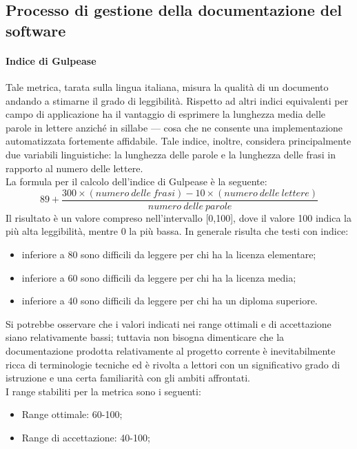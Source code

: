 			\subsection[Processo di gestione della documentazione del software]{\hypertarget{pgds}{Processo di gestione della documentazione del software}}
				
			\paragraph[Indice di Gulpease]{\hypertarget{ig}{Indice di Gulpease}}
			Tale metrica, tarata sulla lingua italiana, misura la qualità di un documento andando a stimarne il grado di leggibilità. Rispetto ad altri indici equivalenti per campo di applicazione ha il vantaggio di esprimere la lunghezza media delle parole in lettere anziché in sillabe --- cosa che ne consente una implementazione automatizzata fortemente affidabile. Tale indice, inoltre, considera principalmente due variabili linguistiche: la lunghezza delle parole e la lunghezza delle frasi in rapporto al numero delle lettere.
			\\La formula per il calcolo dell'indice di Gulpease è la seguente:
				\begin{equation}
					89+\frac{300\times(numero~delle~frasi)-10\times(numero~delle~lettere)}{numero~delle~parole}
				\end{equation}
			Il risultato è un valore compreso nell'intervallo [0,100], dove il valore 100 indica la più alta leggibilità, mentre 0 la più bassa. In generale risulta che testi con indice:
				\begin{itemize}
					\item inferiore a 80 sono difficili da leggere per chi ha la licenza elementare;
					\item inferiore a 60 sono difficili da leggere per chi ha la licenza media;
					\item inferiore a 40 sono difficili da leggere per chi ha un diploma superiore.	
				\end{itemize}
			Si potrebbe osservare che i valori indicati nei range ottimali e di accettazione siano relativamente bassi; tuttavia non bisogna dimenticare che la documentazione prodotta relativamente al progetto corrente è inevitabilmente ricca di terminologie tecniche ed è rivolta a lettori con un significativo grado di istruzione e una certa familiarità con gli ambiti affrontati.
			\\I range stabiliti per la metrica sono i seguenti:
				\begin{itemize}
					\item Range ottimale: 60-100;
					\item Range di accettazione: 40-100;
				\end{itemize}
				
